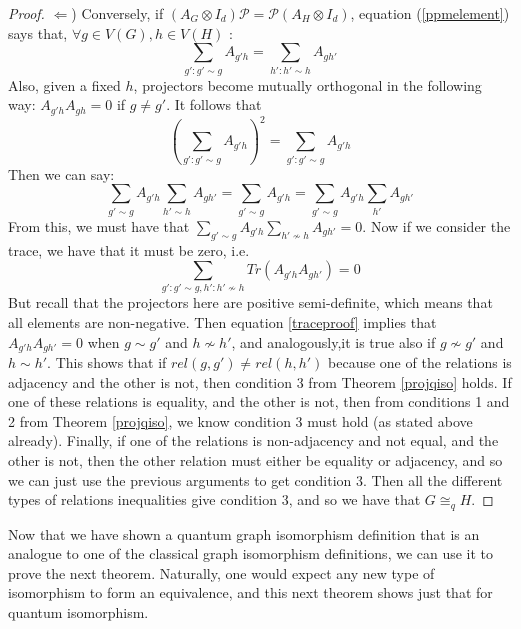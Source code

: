 \documentclass[12pt]{article}
\begin{document}
\begin{proof}
$\Leftarrow$) Conversely, if $(A_G \otimes I_d)\mathcal{P} =
\mathcal{P} (A_H \otimes I_d)$, equation (\ref{ppmelement}) says that,
$\forall g \in V(G), h \in V(H)$ :
\begin{equation}
\sum_{g':g' \sim g} A_{g'h} = \sum_{h':h' \sim h} A_{gh'}
\end{equation}
Also, given a fixed $h$, projectors become mutually orthogonal in the
following way: $A_{g'h}A_{gh}=0$ if $g \neq g'$. It follows that
\begin{equation}
(\sum_{g':g' \sim g} A_{g'h})^2 = \sum_{g':g' \sim g} A_{g'h}
\end{equation}
Then we can say:
\begin{equation}
\sum_{g' \sim g} A_{g'h} \sum_{h' \sim h} A_{gh'} = \sum_{g' \sim g}
A_{g'h}= \sum_{g' \sim g} A_{g'h} \sum_{h'} A_{gh'}
\end{equation}
From this, we must have that $\sum_{g' \sim g} A_{g'h} \sum_{h' \nsim
  h} A_{gh'} = 0$. Now if we consider the trace, we have that it must
be zero, i.e.
\begin{equation} \label{traceproof}
\sum_{g':g' \sim g, h':h' \nsim h} Tr(A_{g'h}A_{gh'}) = 0
\end{equation}
But recall that the projectors here are positive semi-definite, which
means that all elements are non-negative. Then equation
\ref{traceproof} implies that $A_{g'h}A_{gh'} = 0$ when $g \sim g'$
and $h \nsim h'$, and analogously,it is true also if $g \nsim g'$ and
$h \sim h'$. This shows that if $rel(g,g') \neq rel(h,h')$ because one
of the relations is adjacency and the other is not, then condition 3
from Theorem \ref{projqiso} holds. If one of these relations is
equality, and the other is not, then from conditions 1 and 2 from
Theorem \ref{projqiso}, we know condition 3 must hold (as stated above
already). Finally, if one of the relations is non-adjacency and not
equal, and the other is not, then the other relation must either be
equality or adjacency, and so we can just use the previous arguments
to get condition 3. Then all the different types of relations
inequalities give condition 3, and so we have that $G \cong_q H$.
\end{proof}

Now that we have shown a quantum graph isomorphism definition that is
an analogue to one of the classical graph isomorphism definitions, we
can use it to prove the next theorem. Naturally, one would expect any
new type of isomorphism to form an equivalence, and this next theorem
shows just that for quantum isomorphism.
\end{document}
